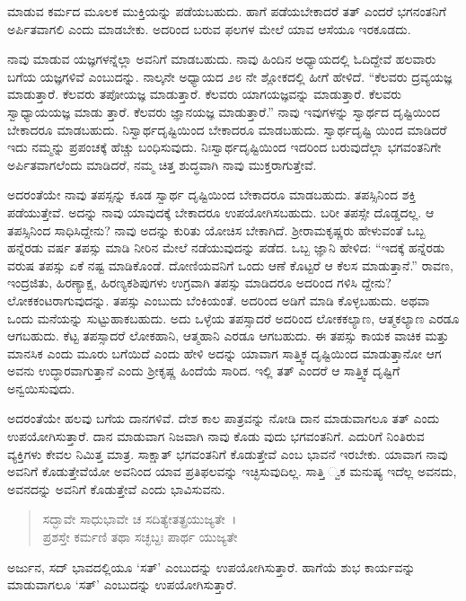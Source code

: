ಮಾಡುವ ಕರ್ಮದ ಮೂಲಕ ಮುಕ್ತಿಯನ್ನು ಪಡೆಯಬಹುದು. ಹಾಗೆ ಪಡೆಯಬೇಕಾದರೆ ತತ್ ಎಂದರೆ ಭಗನಂತನಿಗೆ ಅರ್ಪಿತವಾಗಲಿ ಎಂದು ಮಾಡಬೇಕು. ಅದರಿಂದ ಬರುವ ಫಲಗಳ ಮೇಲೆ ಯಾವ ಆಸೆಯೂ ಇರಕೂಡದು.

ನಾವು ಮಾಡುವ ಯಜ್ಞಗಳನ್ನೆಲ್ಲಾ ಅವನಿಗೆ ಮಾಡಬಹುದು. ನಾವು ಹಿಂದಿನ ಅಧ್ಯಾಯದಲ್ಲಿ ಓದಿದ್ದೇವೆ ಹಲವಾರು ಬಗೆಯ ಯಜ್ಞಗಳಿವೆ ಎಂಬುದನ್ನು. ನಾಲ್ಕನೇ ಅಧ್ಯಾಯದ ೨೮ ನೇ ಶ್ಲೋಕದಲ್ಲಿ ಹೀಗೆ ಹೇಳಿದೆ. “ಕೆಲವರು ದ್ರವ್ಯಯಜ್ಞ ಮಾಡುತ್ತಾರೆ. ಕೆಲವರು ತಪೋಯಜ್ಞ ಮಾಡುತ್ತಾರೆ. ಕೆಲವರು ಯಾಗಯಜ್ಞವನ್ನು ಮಾಡುತ್ತಾರೆ. ಕೆಲವರು ಸ್ವಾಧ್ಯಾಯಯಜ್ಞ ಮಾಡು ತ್ತಾರೆ. ಕೆಲವರು ಜ್ಞಾನಯಜ್ಞ ಮಾಡುತ್ತಾರೆ.” ನಾವು ಇವುಗಳನ್ನು ಸ್ವಾರ್ಥದ ದೃಷ್ಟಿಯಿಂದ ಬೇಕಾದರೂ ಮಾಡಬಹುದು. ನಿಸ್ವಾರ್ಥದೃಷ್ಟಿಯಿಂದ ಬೇಕಾದರೂ ಮಾಡಬಹುದು. ಸ್ವಾರ್ಥದೃಷ್ಟಿ ಯಿಂದ ಮಾಡಿದರೆ ಇದು ನಮ್ಮನ್ನು ಪ್ರಪಂಚಕ್ಕೆ ಹೆಚ್ಚು ಬಂಧಿಸುವುದು. ನಿಃಸ್ವಾರ್ಥದೃಷ್ಟಿಯಿಂದ ಇದರಿಂದ ಬರುವುದೆಲ್ಲಾ ಭಗವಂತನಿಗೇ ಅರ್ಪಿತವಾಗಲೆಂದು ಮಾಡಿದರೆ, ನಮ್ಮ ಚಿತ್ತ ಶುದ್ಧವಾಗಿ ನಾವು ಮುಕ್ತರಾಗುತ್ತೇವೆ.

ಅದರಂತೆಯೇ ನಾವು ತಪಸ್ಸನ್ನು ಕೂಡ ಸ್ವಾರ್ಥ ದೃಷ್ಟಿಯಿಂದ ಬೇಕಾದರೂ ಮಾಡಬಹುದು. ತಪಸ್ಸಿನಿಂದ ಶಕ್ತಿ ಪಡೆಯುತ್ತೇವೆ. ಅದನ್ನು ನಾವು ಯಾವುದಕ್ಕೆ ಬೇಕಾದರೂ ಉಪಯೋಗಿಸಬಹುದು. ಬರೀ ತಪಸ್ಸೇ ದೊಡ್ಡದಲ್ಲ. ಆ ತಪಸ್ಸಿನಿಂದ ಸಾಧಿಸಿದ್ದೇನು? ನಾವು ಅದನ್ನು ಕುರಿತು ಯೋಚಿಸ ಬೇಕಾಗಿದೆ. ಶ‍್ರೀರಾಮಕೃಷ್ಣರು ಹೇಳುವಂತೆ ಒಬ್ಬ ಹನ್ನೆರಡು ವರ್ಷ ತಪಸ್ಸು ಮಾಡಿ ನೀರಿನ ಮೇಲೆ ನಡೆಯುವುದನ್ನು ಪಡೆದ. ಒಬ್ಬ ಜ್ಞಾನಿ ಹೇಳಿದ: “ಇದಕ್ಕೆ ಹನ್ನೆರಡು ವರುಷ ತಪಸ್ಸು ಏಕೆ ನಷ್ಟ ಮಾಡಿಕೊಂಡೆ. ದೋಣಿಯವನಿಗೆ ಒಂದು ಆಣೆ ಕೊಟ್ಟರೆ ಆ ಕೆಲಸ ಮಾಡುತ್ತಾನೆ.” ರಾವಣ, ಇಂದ್ರಜಿತು, ಹಿರಣ್ಯಾಕ್ಷ, ಹಿರಣ್ಯಕಶಿಪುಗಳು ಉಗ್ರವಾಗಿ ತಪಸ್ಸು ಮಾಡಿದರೂ ಅದರಿಂದ ಗಳಿಸಿ ದ್ದೇನು? ಲೋಕಕಂಟರಾಗುವುದನ್ನು. ತಪಸ್ಸು ಎಂಬುದು ಬೆಂಕಿಯಂತೆ. ಅದರಿಂದ ಅಡಿಗೆ ಮಾಡಿ ಕೊಳ್ಳಬಹುದು. ಅಥವಾ ಒಂದು ಮನೆಯನ್ನು ಸುಟ್ಟುಹಾಕಬಹುದು. ಅದು ಒಳ್ಳೆಯ ತಪಸ್ಸಾದರೆ ಅದರಿಂದ ಲೋಕಕಲ್ಯಾಣ, ಆತ್ಮಕಲ್ಯಾಣ ಎರಡೂ ಆಗಬಹುದು. ಕೆಟ್ಟ ತಪಸ್ಸಾದರೆ ಲೋಕಹಾನಿ, ಆತ್ಮಹಾನಿ ಎರಡೂ ಆಗಬಹುದು. ಈ ತಪಸ್ಸು ಕಾಯಕ ವಾಚಿಕ ಮತ್ತು ಮಾನಸಿಕ ಎಂದು ಮೂರು ಬಗೆಯಿದೆ ಎಂದು ಹೇಳಿ ಅದನ್ನು ಯಾವಾಗ ಸಾತ್ತ್ವಿಕ ದೃಷ್ಟಿಯಿಂದ ಮಾಡುತ್ತಾನೋ ಆಗ ಅವನು ಉದ್ಧಾರವಾಗುತ್ತಾನೆ ಎಂದು ಶ‍್ರೀಕೃಷ್ಣ ಹಿಂದೆಯೆ ಸಾರಿದ. ಇಲ್ಲಿ ತತ್ ಎಂದರೆ ಆ ಸಾತ್ತ್ವಿಕ ದೃಷ್ಟಿಗೆ ಅನ್ವಯಿಸುವುದು.

ಅದರಂತೆಯೇ ಹಲವು ಬಗೆಯ ದಾನಗಳಿವೆ. ದೇಶ ಕಾಲ ಪಾತ್ರವನ್ನು ನೋಡಿ ದಾನ ಮಾಡುವಾಗಲೂ ತತ್ ಎಂದು ಉಪಯೋಗಿಸುತ್ತಾರೆ. ದಾನ ಮಾಡುವಾಗ ನಿಜವಾಗಿ ನಾವು ಕೊಡು ವುದು ಭಗವಂತನಿಗೆ. ಎದುರಿಗೆ ನಿಂತಿರುವ ವ್ಯಕ್ತಿಗಳು ಕೇವಲ ನಿಮಿತ್ತ ಮಾತ್ರ. ಸಾಕ್ಷಾತ್ ಭಗವಂತನಿಗೆ ಕೊಡುತ್ತೇವೆ ಎಂಬ ಭಾವನೆ ಇರಬೇಕು. ಯಾವಾಗ ನಾವು ಅವನಿಗೆ ಕೊಡುತ್ತೇವೆಯೋ ಅವನಿಂದ ಯಾವ ಪ್ರತಿಫಲವನ್ನು ಇಚ್ಛಿಸುವುದಿಲ್ಲ. ಸಾತ್ತಿ ್ವಕ ಮನುಷ್ಯ ಇದೆಲ್ಲ ಅವನದು, ಅವನದನ್ನು ಅವನಿಗೆ ಕೊಡುತ್ತೇವೆ ಎಂದು ಭಾವಿಸುವನು.

\begin{verse}
ಸದ್ಭಾವೇ ಸಾಧುಭಾವೇ ಚ ಸದಿತ್ಯೇತತ್ಪ್ರಯುಜ್ಯತೇ~।\\ಪ್ರಶಸ್ತೇ ಕರ್ಮಣಿ ತಥಾ ಸಚ್ಛಬ್ದಃ ಪಾರ್ಥ ಯುಜ್ಯತೇ 
\end{verse}

{\small ಅರ್ಜುನ, ಸದ್ ಭಾವದಲ್ಲಿಯೂ ‘ಸತ್​’ ಎಂಬುದನ್ನು ಉಪಯೋಗಿಸುತ್ತಾರೆ. ಹಾಗೆಯೆ ಶುಭ ಕಾರ್ಯವನ್ನು ಮಾಡುವಾಗಲೂ ‘ಸತ್​’ ಎಂಬುದನ್ನು ಉಪಯೋಗಿಸುತ್ತಾರೆ.}

